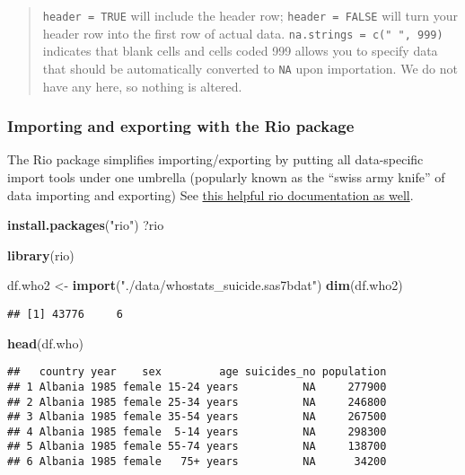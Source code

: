 \documentclass[]{article}
\newenvironment{Shaded}{\begin{snugshade}}{\end{snugshade}}
\newcommand{\KeywordTok}[1]{\textcolor[rgb]{0.13,0.29,0.53}{\textbf{#1}}}
\newcommand{\StringTok}[1]{\textcolor[rgb]{0.31,0.60,0.02}{#1}}
\newcommand{\NormalTok}[1]{#1}
\begin{document}
\begin{quote}
\texttt{header\ =\ TRUE} will include the header row;
\texttt{header\ =\ FALSE} will turn your header row into the first row
of actual data. \texttt{na.strings\ =\ c("\ ",\ 999)} indicates that
blank cells and cells coded 999 allows you to specify data that should
be automatically converted to \texttt{NA} upon importation. We do not
have any here, so nothing is altered.
\end{quote}

\subsubsection{Importing and exporting with the Rio
package}\label{importing-and-exporting-with-the-rio-package}

The Rio package simplifies importing/exporting by putting all
data-specific import tools under one umbrella (popularly known as the
``swiss army knife'' of data importing and exporting) See
\href{https://cran.r-project.org/web/packages/rio/vignettes/rio.html}{this
helpful rio documentation as well}.

\begin{Shaded}
\begin{Highlighting}[]
\KeywordTok{install.packages}\NormalTok{(}\StringTok{"rio"}\NormalTok{)}
\NormalTok{?rio}
\end{Highlighting}
\end{Shaded}

\begin{Shaded}
\begin{Highlighting}[]
\KeywordTok{library}\NormalTok{(rio)}

\NormalTok{df.who2 <-}\StringTok{ }\KeywordTok{import}\NormalTok{(}\StringTok{"./data/whostats_suicide.sas7bdat"}\NormalTok{)}
 \KeywordTok{dim}\NormalTok{(df.who2)}
\end{Highlighting}
\end{Shaded}

\begin{verbatim}
## [1] 43776     6
\end{verbatim}

\begin{Shaded}
\begin{Highlighting}[]
 \KeywordTok{head}\NormalTok{(df.who)}
\end{Highlighting}
\end{Shaded}

\begin{verbatim}
##   country year    sex         age suicides_no population
## 1 Albania 1985 female 15-24 years          NA     277900
## 2 Albania 1985 female 25-34 years          NA     246800
## 3 Albania 1985 female 35-54 years          NA     267500
## 4 Albania 1985 female  5-14 years          NA     298300
## 5 Albania 1985 female 55-74 years          NA     138700
## 6 Albania 1985 female   75+ years          NA      34200
\end{verbatim}
\end{document}
